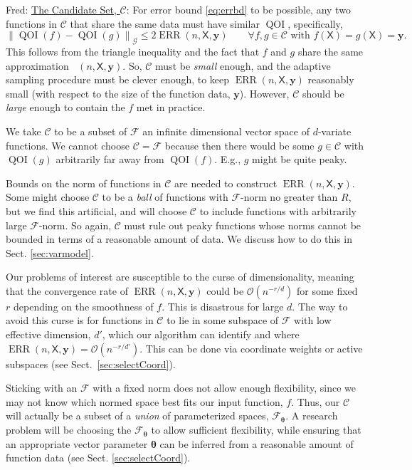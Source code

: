 \documentclass[11pt]{NSFamsart}
\newcommand{\Upara}[1]{\noindent\underline{\upshape #1}:}
\DeclareMathOperator{\QOI}{QOI} %
\DeclareMathOperator{\APP}{\widehat{\QOI}}
\DeclareMathOperator{\ERR}{ERR}
\newcommand{\mX}{\mathsf{X}}
\newcommand{\by}{{\boldsymbol{y}}}
\newcommand{\btheta}{{\boldsymbol{\theta}}}
\newcommand{\calc}{{\mathcal{C}}}
\newcommand{\calf}{{\mathcal{F}}}
\newcommand{\calg}{{\mathcal{G}}}
\newcommand{\bignorm}[2][{}]{\ensuremath{\bigl \lVert #2 \bigr \rVert}_{#1}}
\newcommand{\Order}{\mathcal{O}}
\newcommand{\FJHNote}[1]{{\color{blue}Fred: #1}}
\begin{document}
\FJHNote{\Upara{The Candidate Set, $\calc$} 
For error bound \eqref{eq:errbd}  to be possible, any two functions in $\calc$ that share the same data must have similar $\QOI$, specifically, 
\begin{equation} \label{eq:Csmall}
	\bignorm[\calg]{\QOI(f) - \QOI(g)} \le 2 \ERR(n,\mX,\by) \qquad \forall f, g \in \calc \text{ with } f(\mX) = g(\mX) = \by.
\end{equation}
This follows from the triangle inequality and the fact that $f$ and $g$ share the same approximation $\APP(n,\mX,\by)$. So, $\calc$ must be \emph{small} enough, and the adaptive sampling procedure must be clever enough, to keep $\ERR(n,\mX,\by)$ reasonably small (with respect to the size of the function data, $\by$).  However, $\calc$ should be \emph{large} enough to contain the $f$ met in practice.

We take $\calc$ to be a subset of $\calf$ an infinite dimensional vector space of $d$-variate functions. We cannot choose $\calc = \calf$ because then there would be some $g \in \calc$ with $\QOI(g)$ arbitrarily far away from $\QOI(f)$.  E.g., $g$ might be quite peaky.

Bounds on the norm of functions in  $\calc$ are needed to construct $\ERR(n,\mX,\by)$.  Some might choose $\calc$ to be a \emph{ball} of functions with $\calf$-norm no greater than $R$, but we find this artificial, and will choose $\calc$ to include functions with arbitrarily large $\calf$-norm.  So again, $\calc$ must rule out peaky functions whose norms cannot be bounded in terms of a reasonable amount of data.  We discuss how to do this in Sect. \ref{sec:varmodel}.

Our problems of interest are susceptible to the curse of dimensionality, meaning that the convergence rate of $\ERR(n,\mX,\by)$ could be $\Order(n^{-r/d})$ for some fixed $r$ depending on the smoothness of $f$.  This  is disastrous for large $d$.  The way to avoid this curse is for functions in $\calc$ to lie in some subspace of $\calf$ with low effective dimension, $d'$, which our algorithm can identify and where $\ERR(n,\mX,\by) = \Order(n^{-r/d'})$.  This can be done via coordinate weights or active subspaces (see Sect.\ \ref{sec:selectCoord}). 

Sticking with an $\calf$ with a fixed norm does not allow enough flexibility, since we may not know which normed space best fits our input function, $f$.  Thus, our $\calc$ will actually be a subset of  a \emph{union} of parameterized spaces, $\calf_\btheta$.  A research problem will be choosing the $\calf_\btheta$ to allow sufficient flexibility, while ensuring that an appropriate vector parameter $\btheta$ can be inferred from a reasonable amount of function data (see Sect. \ref{sec:selectCoord}).

}
\end{document}
